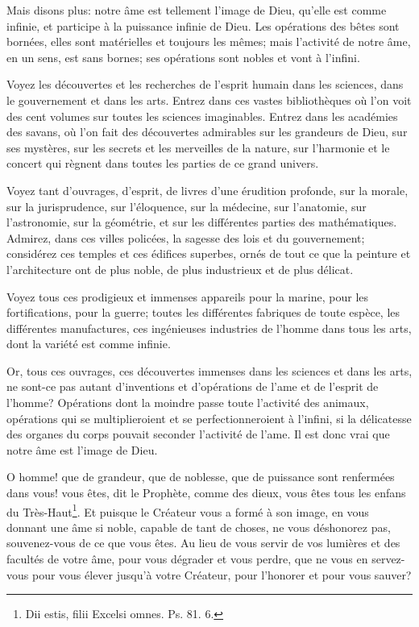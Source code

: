 \documentclass[instructions.tex]{subfiles}
\begin{document}
\secondo Mais disons plus: notre âme est tellement l’image de Dieu, qu’elle est comme infinie, et participe à la puissance infinie de Dieu. Les opérations des bêtes sont bornées, elles sont matérielles et toujours les mêmes; mais l’activité de notre âme, en un sens, est sans bornes; ses opérations sont nobles et vont à l’infini.

Voyez les découvertes et les recherches de l’esprit humain dans les sciences, dans le gouvernement et dans les arts. Entrez dans ces vastes bibliothèques où l’on voit des cent volumes sur toutes les sciences imaginables. Entrez dans les académies des savans, où l’on fait des découvertes admirables sur les grandeurs de Dieu, sur ses mystères, sur les secrets et les merveilles de la nature, sur l’harmonie et le concert qui règnent dans toutes les parties de ce grand univers.

Voyez tant d’ouvrages, d’esprit, de livres d’une érudition profonde, sur la morale, sur la jurisprudence, sur l’éloquence, sur la médecine, sur l’anatomie, sur l’astronomie, sur la géométrie, et sur les différentes parties des mathématiques. Admirez, dans ces villes policées, la sagesse des lois et du gouvernement; considérez ces temples et ces édifices superbes, ornés de tout ce que la peinture et l’architecture ont de plus noble, de plus industrieux et de plus délicat.

Voyez tous ces prodigieux et immenses appareils pour la marine, pour les fortifications, pour la guerre; toutes les différentes fabriques de toute espèce, les différentes manufactures, ces ingénieuses industries de l’homme dans tous les arts, dont la variété est comme infinie.

Or, tous ces ouvrages, ces découvertes immenses dans les sciences et dans les arts, ne sont-ce pas autant d’inventions et d’opérations de l’ame et de l’esprit de l’homme? Opérations dont la moindre passe toute l’activité des animaux, opérations qui se multiplieroient et se perfectionneroient à l’infini, si la délicatesse des organes du corps pouvait seconder l’activité de l’ame. Il est donc vrai que notre âme est l’image de Dieu.

O homme! que de grandeur, que de noblesse, que de puissance sont renfermées dans vous! vous êtes, dit le Prophète, comme des dieux, vous êtes tous les enfans du Très-Haut\footnote{Dii estis, filii Excelsi omnes. Ps. 81. 6.}. Et puisque le Créateur vous a formé à son image, en vous donnant une âme si noble, capable de tant de choses, ne vous déshonorez pas, souvenez-vous de ce que vous êtes. Au lieu de vous servir de vos lumières et des facultés de votre âme, pour vous dégrader et vous perdre, que ne vous en servez-vous pour vous élever jusqu’à votre Créateur, pour l’honorer et pour vous sauver?
 
\end{document}
